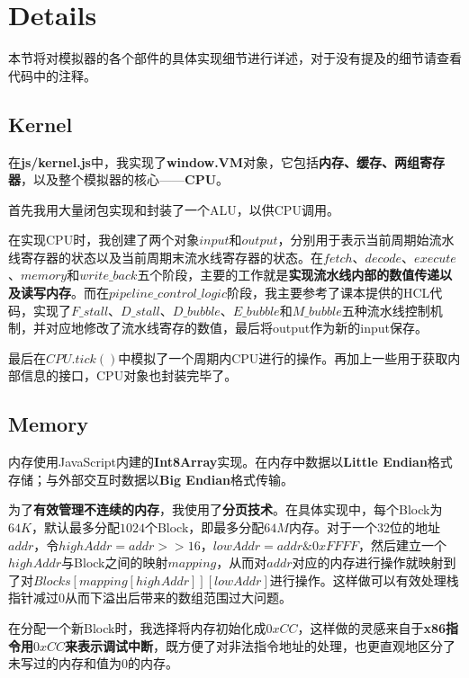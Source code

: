 
\section{Details}

本节将对模拟器的各个部件的具体实现细节进行详述，对于没有提及的细节请查看代码中的注释。

\subsection{Kernel}

在{\bf js/kernel.js}中，我实现了{\bf window.VM}对象，它包括{\bf 内存、缓存、两组寄存器}，以及整个模拟器的核心——{\bf CPU}。

首先我用大量闭包实现和封装了一个ALU，以供CPU调用。

在实现CPU时，我创建了两个对象$input$和$output$，分别用于表示当前周期始流水线寄存器的状态以及当前周期末流水线寄存器的状态。在$fetch$、$decode$、$execute$、$memory$和$write\_back$五个阶段，主要的工作就是{\bf 实现流水线内部的数值传递以及读写内存}。而在$pipeline\_control\_logic$阶段，我主要参考了课本提供的HCL代码，实现了$F\_stall$、$D\_stall$、$D\_bubble$、$E\_bubble$和$M\_bubble$五种流水线控制机制，并对应地修改了流水线寄存的数值，最后将output作为新的input保存。

最后在$CPU.tick()$中模拟了一个周期内CPU进行的操作。再加上一些用于获取内部信息的接口，CPU对象也封装完毕了。

\subsection{Memory}

内存使用JavaScript内建的{\bf Int8Array}实现。在内存中数据以{\bf Little Endian}格式存储；与外部交互时数据以{\bf Big Endian}格式传输。

为了{\bf 有效管理不连续的内存}，我使用了{\bf 分页技术}。在具体实现中，每个Block为$64K$，默认最多分配$1024$个Block，即最多分配$64M$内存。对于一个$32$位的地址$addr$，令$highAddr = addr >> 16$，$lowAddr = addr \& 0xFFFF$，然后建立一个$highAddr$与Block之间的映射$mapping$，从而对$addr$对应的内存进行操作就映射到了对$Blocks[mapping[highAddr]][lowAddr]$进行操作。这样做可以有效处理栈指针减过$0$从而下溢出后带来的数组范围过大问题。

在分配一个新Block时，我选择将内存初始化成$0xCC$，这样做的灵感来自于{\bf x86指令用$0xCC$来表示调试中断}，既方便了对非法指令地址的处理，也更直观地区分了未写过的内存和值为$0$的内存。

